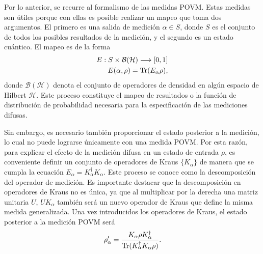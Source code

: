 Por lo anterior, se recurre al formalismo de las medidas POVM\@. Estas medidas
son útiles porque con ellas es posible realizar un mapeo que toma dos
argumentos. El primero es una salida de medición $\alpha \in S $, donde $S$ es
el conjunto de todos los posibles resultados de la medición, y el segundo es un
estado cuántico. El mapeo es de la forma 
\begin{equation}\begin{split}
    E:S\times \mathcal{B(H)}\longrightarrow [0,1]\\
    E(\alpha,\rho)={\rm Tr}(E_\alpha\rho),
\end{split}\end{equation} donde $\mathcal{B(H)}$ denota el conjunto de operadores de densidad en algún espacio de Hilbert $\mathcal{H}$. 
Este proceso constituye el mapeo de resultados o la función de
distribución de probabilidad necesaria para la especificación de las mediciones
difusas.


Sin embargo, es necesario también proporcionar el estado posterior a la
medición, lo cual no puede lograrse únicamente con una medida POVM\@. Por esta
razón, para explicar el efecto de la medición difusa en un estado de entrada
$\rho$, es conveniente definir un conjunto de operadores de Kraus
$\{K_\alpha\}$ de manera que se cumpla la ecuación $E_\alpha=K_\alpha^\dagger
K_\alpha$. Este proceso se conoce como la descomposición del operador de
medición. Es importante destacar que la descomposición en operadores de Kraus
no es única, ya que al multiplicar por la derecha una matriz unitaria $U$,
$UK_{\alpha}$ también será un nuevo operador de Kraus que define la misma
medida generalizada. Una vez introducidos los operadores de Kraus, el estado
posterior a la medición POVM será 
\begin{equation}
\rho'_\alpha=\dfrac{K_\alpha \rho K_\alpha^\dagger}{{\rm Tr}(K_\alpha^\dagger K_\alpha \rho)}.
\end{equation}





